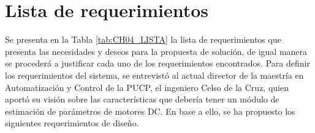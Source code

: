 \section{Lista de requerimientos}
\label{sec:.lista de req}

\noindent
Se presenta en la Tabla \ref{tab:CH04_LISTA} la lista de requerimientos que presenta las necesidades y deseos para la propuesta de solución, de igual manera se procederá a justificar cada uno de los requerimientos encontrados. Para definir los requerimientos del sistema, se entrevistó al actual director de la maestría en Automatización y Control de la PUCP, el ingeniero Celso de la Cruz, quien aportó su visión sobre las características que debería tener un módulo de estimación de parámetros de motores \ac{DC}. En base a ello, se ha propuesto los siguientes requerimientos de diseño.


